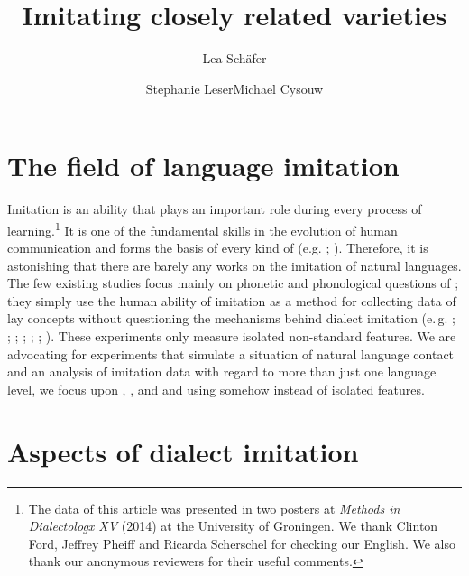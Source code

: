 \documentclass[output=paper]{LSP/langsci}
\author{Lea Schäfer\affiliation{Philipps-Universität Marburg}\and Stephanie Leser\affiliation{Philipps-Universität Marburg}\lastand Michael Cysouw\affiliation{Philipps-Universität Marburg}}
\title{Imitating closely related varieties}
\begin{document}
   

\section{The field of language imitation}\label{abstract}

Imitation is an ability that plays an important role during every process of learning.\footnote{The data of this article was presented in two posters at \textit{Methods in Dialectologx XV} (2014) at the University of Groningen. We thank Clinton Ford, Jeffrey Pheiff and Ricarda Scherschel for checking our English. We also thank our anonymous reviewers for their useful comments.} It is one of the fundamental skills in the evolution of human communication and forms the basis of every kind of   (e.g. \citealt{fitch_evolution_2010,hauser_language_2002,petkov_birds_2012,uzgiris_two_1981,markham_phonetic_1997,markham_listeners_1999,meltzoff_imitation_1977,meltzoff_imitative_2002}; \citealt[123]{tomasello_shared_2007}). Therefore, it is astonishing that there are barely any  works on the imitation of natural languages. The few existing studies focus mainly on phonetic and phonological questions of ; they simply use the human ability of imitation as a method for collecting data of lay concepts without questioning the mechanisms behind dialect imitation (e.\,g. \citealt{segerup_imitation_1999}; \cite{siegel_second_2010}; \cite{adank_imitation_2010}; \cite{purschke_imitation_2010}; \cite{babel_phonetic_2009}; \cite{neuhauser_phonetische_2012}; \cite{dossey_spontaneous_2012}). These experiments only measure isolated non-standard features. We are advocating for experiments that simulate a situation of natural language contact and an analysis of imitation data with regard to more than just one language level, we focus upon , ,  and  and using somehow  instead of isolated features.
    
\section{Aspects of dialect imitation}\label{aspects}
\end{document}
